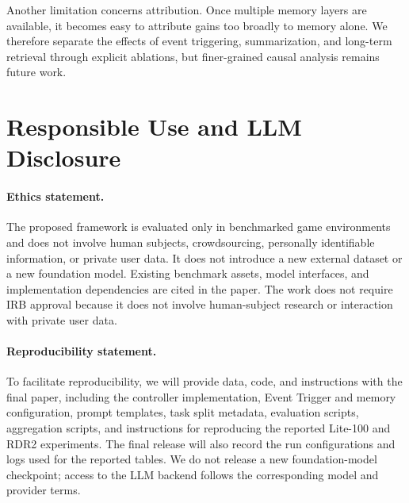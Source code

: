 Another limitation concerns attribution. Once multiple memory layers are
available, it becomes easy to attribute gains too broadly to memory alone. We
therefore separate the effects of event triggering, summarization, and long-term
retrieval through explicit ablations, but finer-grained causal analysis remains
future work.

\section{Responsible Use and LLM Disclosure}
\label{sec:appendix_responsible_use}

\paragraph{Ethics statement.}
\label{sec:appendix_ethics_statement}
The proposed framework is evaluated only in benchmarked game environments and
does not involve human subjects, crowdsourcing, personally identifiable
information, or private user data. It does not introduce a new external dataset
or a new foundation model. Existing benchmark assets, model interfaces, and
implementation dependencies are cited in the paper. The work does not require
IRB approval because it does not involve human-subject research or interaction
with private user data.

\paragraph{Reproducibility statement.}
\label{sec:appendix_release_reproducibility_statement}
To facilitate reproducibility, we will provide data, code, and instructions with
the final paper, including the controller implementation, Event Trigger
and memory configuration, prompt templates, task split metadata, evaluation
scripts, aggregation scripts, and instructions for reproducing the reported
Lite-100 and RDR2 experiments. The final release will also record the run
configurations and logs used for the reported tables. We do not release a new
foundation-model checkpoint; access to the LLM backend follows the corresponding
model and provider terms.

